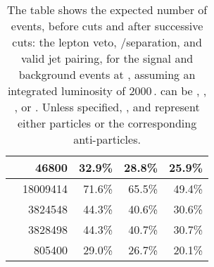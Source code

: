 \begin{table}[!tbp]
\begin{tabular}{lrrrr}
\egamma{\Pepm}{\Pphoton}{\EPA}{\Pquark \Pquark \PHiggs \Pnu} & 46800 & 32.9\% &28.8\% & 25.9\% \\
\hline
\gammagamma{\Pphoton}{\BS}{\Pphoton}{\BS}{ \Pquark \Pquark \Pquark \Pquark}& 18009414  & 71.6\%& 65.5\%& 49.4\%\\
\gammagamma{\Pphoton}{\BS}{\Pphoton}{\EPA}{ \Pquark \Pquark \Pquark \Pquark}& 3824548  &44.3\%& 40.6\%& 30.6\%\\
\gammagamma{\Pphoton}{\EPA}{\Pphoton}{\BS}{ \Pquark \Pquark \Pquark \Pquark}& 3828498 & 44.3\%& 40.7\%& 30.7\%\\
\gammagamma{\Pphoton}{\EPA}{\Pphoton}{\EPA}{ \Pquark \Pquark \Pquark \Pquark}& 805400 & 29.0\% & 26.7\% & 20.1\%\\
\hline \hline
\end{tabular}

\caption
{The table shows the expected number of events, before cuts and after successive cuts: the lepton veto, \eeToHHbbWW/\eeToHHbbbb separation, and valid jet pairing, for the signal and background events at , assuming an integrated luminosity of 2000\,. \Pquark can be \Pup, \Pdown, \Pstrange, \Pbottom or \Ptop. Unless specified, \Pquark, \Plepton and \Pnu represent either particles or the corresponding anti-particles.}
\label{tab:doubleHiggs3TeVPreslection}
\end{table}



